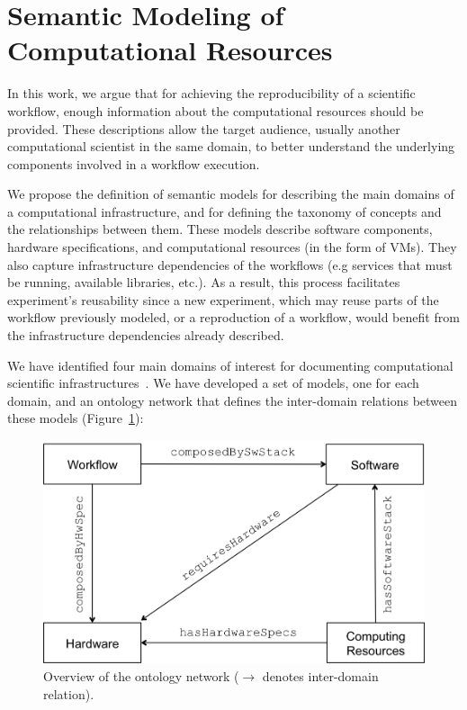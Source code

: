 \section{Semantic Modeling of Computational Resources}
\label{sec:semantic}





In this work, we argue that for achieving the reproducibility of a scientific workflow, enough information 
about the computational resources should be provided. These descriptions allow the target audience, 
usually another computational scientist in the same domain, to better understand the underlying 
components involved in a workflow execution.

We propose the definition of semantic models for describing the main domains of a 
computational infrastructure, and for defining the taxonomy of concepts and the relationships 
between them. These models describe software components, hardware specifications, 
and computational resources (in the form of VMs). They also capture infrastructure 
dependencies of the workflows (e.g services that must be running, available libraries, etc.).
 As a result, this process facilitates experiment's reusability since 
a new experiment, which may reuse parts of the workflow previously modeled, or a reproduction 
of a workflow, would benefit from the infrastructure dependencies already described.

We have identified four main domains of interest for documenting computational scientific 
infrastructures~\cite{wicus}. We have developed a set of models, one for each domain, 
and an ontology network that defines the inter-domain relations between these models 
(Figure~\ref{fig:wicusrels}):

\begin{figure}[!t]
	\centering
	\includegraphics[width=.9\linewidth]{figures/wicusrels}
	\caption{Overview of the ontology network ($\rightarrow$ denotes inter-domain relation).}
	\label{fig:wicusrels}
\end{figure}

